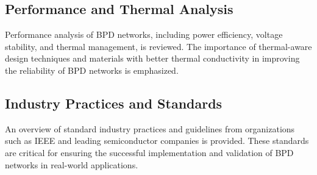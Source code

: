 \subsection{Performance and Thermal Analysis}

Performance analysis of BPD networks, including power efficiency, voltage stability, and thermal management, is reviewed. The importance of thermal-aware design techniques and materials with better thermal conductivity in improving the reliability of BPD networks is emphasized.

\subsection{Industry Practices and Standards}

An overview of standard industry practices and guidelines from organizations such as IEEE and leading semiconductor companies is provided. These standards are critical for ensuring the successful implementation and validation of BPD networks in real-world applications.
